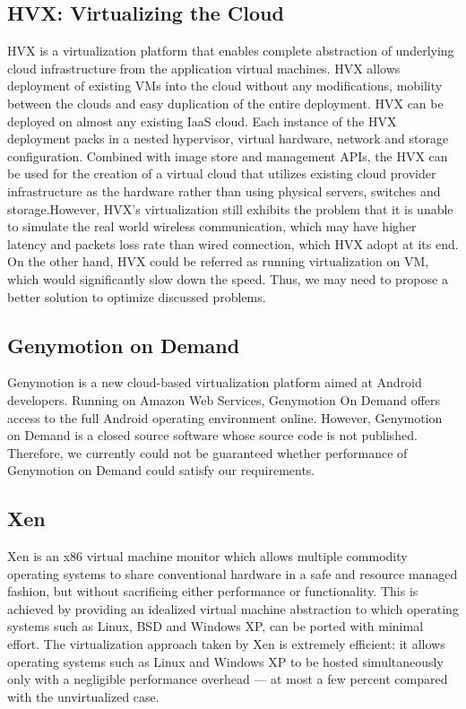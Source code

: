 \documentclass[journal,comsoc]{IEEEtran}
\begin{document}
\subsection{HVX: Virtualizing the Cloud}
HVX \cite{hvx} is a virtualization platform that enables complete abstraction of underlying cloud infrastructure from the application virtual machines. HVX allows deployment of existing VMs into the cloud without any modifications, mobility between the clouds and easy duplication of the entire deployment. HVX can be deployed on almost any existing IaaS cloud. Each instance of the HVX deployment packs in a nested hypervisor, virtual hardware, network and storage configuration. Combined with image store and management APIs, the HVX can be used for the creation of a virtual cloud that utilizes existing cloud provider infrastructure as the hardware rather than using physical servers, switches and storage.However, HVX's virtualization still exhibits the problem that it is unable to simulate the real world wireless communication, which may have higher latency and packets loss rate than wired connection, which HVX adopt at its end.  On the other hand, HVX could be referred as running virtualization on VM, which would significantly slow down the speed. Thus, we may need to propose a better solution to optimize discussed problems. 

\subsection{Genymotion on Demand}
Genymotion \cite{genymotion} is a new cloud-based virtualization platform aimed at Android developers. Running on Amazon Web Services, Genymotion On Demand offers access to the full Android operating environment online. However, Genymotion on Demand is a closed source software whose source code is not published. Therefore, we currently could not be guaranteed whether performance of Genymotion on Demand could satisfy our requirements.

\subsection{Xen}
Xen \cite{barham2003xen} is an x86 virtual machine monitor which allows multiple commodity operating systems to share conventional hardware in a safe and resource managed fashion, but without sacrificing either performance or functionality. This is achieved by providing an idealized virtual machine abstraction to which operating systems such as Linux, BSD and Windows XP, can be ported with minimal effort. The virtualization approach taken by Xen is extremely efficient: it allows operating systems such as Linux and Windows XP to be hosted simultaneously only with a negligible performance overhead --- at most a few percent compared with the unvirtualized case. 
\end{document}
